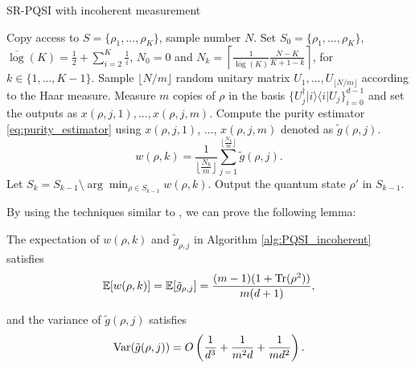 \begin{algorithm}[htb]
    \caption{SR-PQSI with incoherent measurement}
    \label{alg:PQSI_incoherent}
    \begin{algorithmic}
     Copy access to $S = \{\rho_1,...,\rho_K\}$, sample number $N$.
     Set $S_0 = \{\rho_1,...,\rho_K\}$, $\overline{\log}(K) = \frac{1}{2} + \sum_{i=2}^K \frac{1}{i}$, $N_0=0$ and $N_k = \left\lceil \frac{1}{\overline{\log}(K)} \frac{N-K}{K+1-k}\right\rceil$, for $k \in \{1,...,K-1\}$. Sample $\lfloor {N}/m \rfloor$ random unitary matrix $U_1,...,U_{\lfloor N/m \rfloor}$ according to the Haar measure.
        \STATE Measure $m$ copies of $\rho$ in the basis $\{U_j^\dagger|i\rangle \langle i | U_j\}_{i=0}^{d-1}$ and set the outputs as $x{(\rho, j,1)},..., x{(\rho, j,m)}$.
        \STATE Compute the purity estimator \eqref{eq:purity_estimator} using $x{(\rho, j,1)}$, $...$, $x{(\rho, j,m)}$ denoted as $\tilde{g}{(\rho,j)}$.
        \ENDFOR
        \STATE  $$w(\rho,k) = \frac{1}{\lfloor \frac{N_{k}}{m}\rfloor} \sum_{j=1}^{\lfloor \frac{N_{k}}{m}\rfloor} \tilde{g}{(\rho,j)}. $$
        \STATE Let $S_k = S_{k-1} \setminus \arg \min_{\rho \in S_{k-1}} w(\rho,k) $.
    \ENDFOR
    \STATE Output the quantum state $\rho'$ in $S_{k-1}$.

\end{algorithmic}
\end{algorithm}
By using the techniques similar to  \cite{anshu2022distributed}, we can prove the following lemma:
\begin{lemma}
\label{lem: g_var}
    The expectation of $w(\rho,k)$ and $\tilde{g}_{\rho,j}$ in Algorithm \ref{alg:PQSI_incoherent} satisfies
    \begin{equation}
        \mathbb{E}[w(\rho,k)] = \mathbb{E}[\tilde{g}_{\rho,j}] = \frac{(m-1)(1+ \mathrm{Tr}(\rho^2))}{m(d+1)},
    \end{equation}
    
    and the variance of $\tilde{g}(\rho,j)$ satisfies
    \begin{equation}
        \mathrm{Var}(\tilde{g}(\rho,j)) = O\left(\frac{1}{d^3} + \frac{1}{m^2d} + \frac{1}{md^2}\right).
    \end{equation}
\end{lemma}

